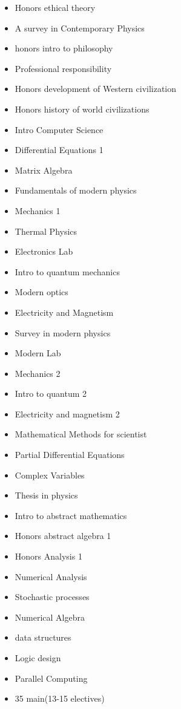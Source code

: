 \begin{itemize}
    \item Honors ethical theory
    \item A survey in Contemporary Physics
    \item honors intro to philosophy
    \item Professional responsibility
    \item Honors development of Western civilization
    \item Honors history of world civilizations
    \item Intro Computer Science
    \item Differential Equations 1
    \item Matrix Algebra
    \item Fundamentals of modern physics
    \item Mechanics 1
    \item Thermal Physics
    \item Electronics Lab
    \item Intro to quantum mechanics
    \item Modern optics
    \item Electricity and Magnetism
    \item Survey in modern physics
    \item Modern Lab
    \item Mechanics 2
    \item Intro to quantum 2
    \item Electricity and magnetism 2
    \item Mathematical Methods for scientist
    \item Partial Differential Equations
    \item Complex Variables
    \item Thesis in physics
    \item Intro to abstract mathematics
    \item Honors abstract algebra 1
    \item Honors Analysis 1
    \item Numerical Analysis
    \item Stochastic processes
    \item Numerical Algebra
    \item data structures
    \item Logic design
    \item Parallel Computing 
    \item 35 main(13-15 electives)

\end{itemize}
